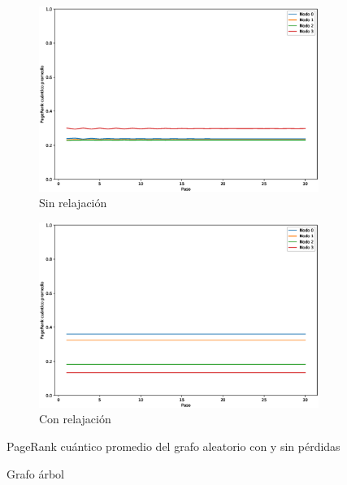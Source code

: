 \documentclass[xetex,mathserif,serif]{beamer}
\begin{document}
\begin{frame}
\begin{figure}[H]
    \centering
    \begin{subfigure}[m]{0.45\textwidth}
        \centering
        \includegraphics[width=0.9\linewidth]{img/crown-mean-lossless.eps}
        \caption{Sin relajación}
    \end{subfigure}
    \begin{subfigure}[m]{0.45\textwidth}
        \centering
        \includegraphics[width=0.9\linewidth]{img/crown-mean-lossy.eps}
        \caption{Con relajación}
    \end{subfigure}
    \caption[PageRank cuántico promedio del grafo aleatorio con y sin pérdidas]{PageRank cuántico promedio del grafo aleatorio con y sin pérdidas}
    \label{fig:meancrownlossy}
\end{figure}










\begin{figure}[H]
    \centering
    \caption[Grafo árbol]{Grafo árbol}
    \label{fig:tree}
\end{figure}


\end{frame}
\end{document}
